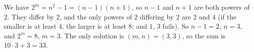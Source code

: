We have $2^m=n^2-1=(n-1)(n+1)$, so $n-1$ and $n+1$ are both powers of $2$. They differ by $2$, and the only powers of $2$ differing by $2$ are $2$ and $4$ (if the smaller is at least $4$, the larger is at least $8$; and $1$, $3$ fails). So $n-1=2$, $n=3$, and $2^m=8$, $m=3$. The only solution is $(m,n)=(3,3)$, so the sum is $10\cdot3+3=\boxed{33}$.
